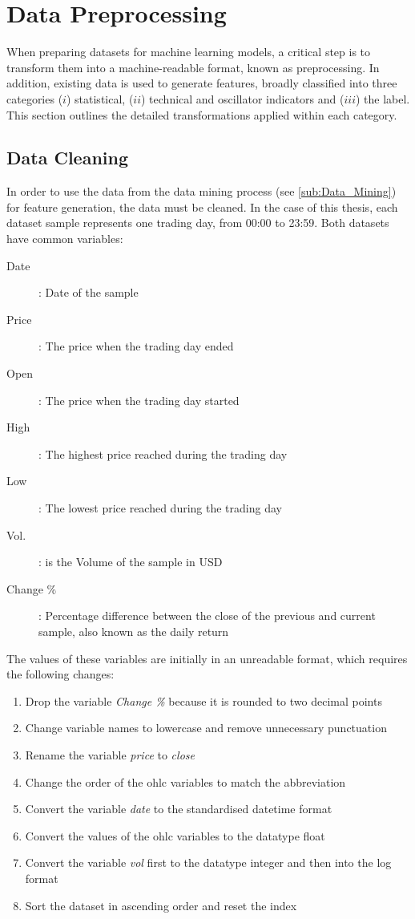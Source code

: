 \section{Data Preprocessing}
\label{sec:Data_Preprocessing}
When preparing datasets for machine learning models, a critical step is to transform them into a machine-readable format, known as preprocessing. In addition, existing data is used to generate features, broadly classified into three categories ($i$) statistical, ($ii$) technical and oscillator indicators and ($iii$) the label. This section outlines the detailed transformations applied within each category.

\subsection{Data Cleaning}
\label{sub:Data_Cleaning}
In order to use the data from the data mining process (see \ref{sub:Data_Mining}) for feature generation, the data must be cleaned. In the case of this thesis, each dataset sample represents one trading day, from 00:00 to 23:59. Both datasets have common variables:

\begin{description}
    \item[Date]: Date of the sample
    \item[Price]: The price when the trading day ended
    \item[Open]: The price when the trading day started
    \item[High]: The highest price reached during the trading day
    \item[Low]: The lowest price reached during the trading day
    \item[Vol.]: is the Volume of the sample in USD
    \item[Change \%]: Percentage difference between the close of the previous and current sample, also known as the daily return
\end{description}

\noindent
The values of these variables are initially in an unreadable format, which requires the following changes:
\begin{enumerate}
    \item Drop the variable \textit{Change \%} because it is rounded to two decimal points
    \item Change variable names to lowercase and remove unnecessary punctuation
    \item Rename the variable \textit{price} to \textit{close}
    \item Change the order of the \gls{ohlc} variables to match the abbreviation
    \item Convert the variable \textit{date} to the standardised datetime format
    \item Convert the values of the \gls{ohlc} variables to the datatype float
    \item Convert the variable \textit{vol} first to the datatype integer and then into the log format
    \item Sort the dataset in ascending order and reset the index
\end{enumerate}

